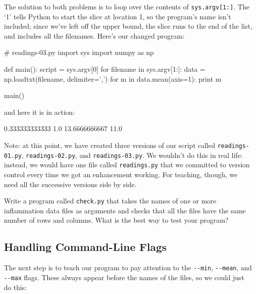 The solution to both problems is to loop over the contents of
\texttt{sys.argv{[}1:{]}}. The `1' tells Python to start the slice at
location 1, so the program's name isn't included; since we've left off
the upper bound, the slice runs to the end of the list, and includes all
the filenames. Here's our changed program:

\begin{VerbIn}
# readings-03.py
import sys
import numpy as np

def main():
    script = sys.argv[0]
    for filename in sys.argv[1:]:
        data = np.loadtxt(filename, delimiter=',')
        for m in data.mean(axis=1):
            print m

main()
\end{VerbIn}

and here it is in action:


\begin{VerbOut}
0.333333333333
1.0
13.6666666667
11.0
\end{VerbOut}

Note: at this point, we have created three versions of our script called
\texttt{readings-01.py}, \texttt{readings-02.py}, and
\texttt{readings-03.py}. We wouldn't do this in real life: instead, we
would have one file called \texttt{readings.py} that we committed to
version control every time we got an enhancement working. For teaching,
though, we need all the successive versions side by side.

\begin{challenge}
  Write a program called \texttt{check.py} that takes the names of one
  or more inflammation data files as arguments and checks that all the
  files have the same number of rows and columns. What is the best way
  to test your program?
\end{challenge}

\subsection{Handling Command-Line Flags}

The next step is to teach our program to pay attention to the
\texttt{-{}-min}, \texttt{-{}-mean}, and \texttt{-{}-max} flags. These
always appear before the names of the files, so we could just do this:

